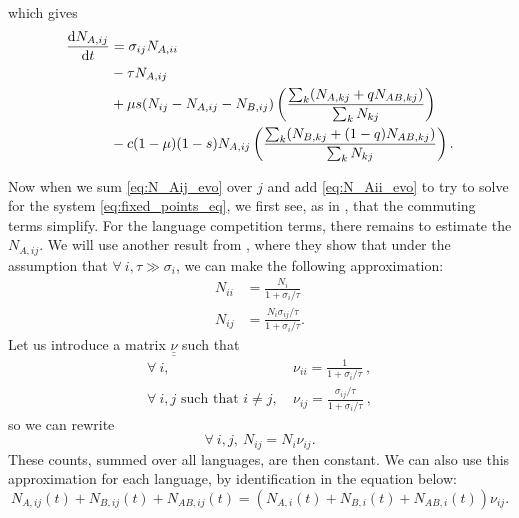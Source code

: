 \documentclass[../thesis.tex]{subfiles}
\begin{document}
which gives
\begin{equation}
\label{eq:N_Aij_evo}
  \begin{aligned}
    \dv{N_{A, ij}}{t} 
      &= \sigma_{ij} N_{A, ii} \\
      &- \tau N_{A, ij} \\
      &+ \mu s (N_{ij} - N_{A, ij} - N_{B, ij}) \left( \frac{\sum_k (N_{A, kj} + q N_{AB, kj})}{\sum_k N_{kj}} \right) \\
      &- c (1-\mu) (1-s) N_{A, ij} \left( \frac{\sum_k (N_{B, kj} + (1-q) N_{AB, kj})}{\sum_k N_{kj}} \right).
  \end{aligned}
\end{equation}

Now when we sum \cref{eq:N_Aij_evo} over $j$ and add \cref{eq:N_Aii_evo} to try to solve
for the system \cref{eq:fixed_points_eq}, we first see, as in \cite{SattenspielStructuredEpidemic1995}, that the commuting terms simplify. For the
language competition terms, there remains to estimate the $N_{A, ij}$. We will use
another result from \cite{BalcanModelingSpatial2010}, where they show that under the
assumption that $\forall ~ i, \tau \gg \sigma_i$, we can make the following approximation:
\begin{equation}
  \begin{aligned}
    N_{ii} &= \frac{N_i}{1 + \sigma_i / \tau} \\
    N_{ij} &= \frac{N_i \sigma_{ij} / \tau}{1 + \sigma_i / \tau}.
  \end{aligned}
\end{equation}
Let us introduce a matrix $\underline{\underline{\nu}}$ such that
\begin{equation}
  \begin{aligned}
    \forall ~ i,
      & ~ \nu_{ii} = \frac{1}{1 + \sigma_i / \tau}~,
    \\
    \forall ~ i, j \text{ such that } i \neq j,
      & ~ \nu_{ij} = \frac{\sigma_{ij} / \tau}{1 + \sigma_i / \tau}~,
  \end{aligned}
\end{equation}
so we can rewrite
\begin{equation}
  \forall ~ i, j, ~ N_{ij} = N_i \nu_{ij}.
\end{equation}
These counts, summed over all languages, are then constant. We can also use this
approximation for each language, by identification in the equation below:
\begin{equation}
  N_{A, ij} (t) + N_{B, ij} (t) + N_{AB, ij} (t) = (N_{A, i} (t) + N_{B, i} (t) + N_{AB, i} (t)) \nu_{ij}.
\end{equation}
\end{document}
